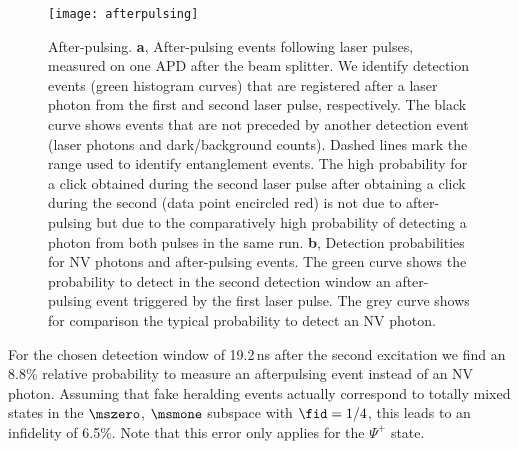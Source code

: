 \begin{figure}[h]
    \centering
    \texttt{[image: afterpulsing]}
    \caption{After-pulsing. \textbf{a}, After-pulsing events following laser pulses, measured on one APD after the beam splitter. We identify detection events (green histogram curves) that are registered after a laser photon from the first and second laser pulse, respectively. The black curve shows events that are not preceded by another detection event (laser photons and dark/background counts). Dashed lines mark the range used to identify entanglement events. The high probability for a click obtained during the second laser pulse after obtaining a click during the second (data point encircled red) is not due to after-pulsing but due to the comparatively high probability of detecting a photon from both pulses in the same run. \textbf{b}, Detection probabilities for NV photons and after-pulsing events. The green curve shows the probability to detect in the second detection window an after-pulsing event triggered by the first laser pulse. The grey curve shows for comparison the typical probability to detect an NV photon.}
	\label{fig:afterpulsing}
\end{figure}

For the chosen detection window of 19.2\,ns after the second excitation we find an 8.8\% relative probability to measure an afterpulsing event instead of an NV photon. Assuming that fake heralding events actually correspond to totally mixed states in the $\mszero$, $\msmone$ subspace with $\fid=1/4$, this leads to an infidelity of 6.5\%. Note that this error only applies for the $\Psi^+$ state.



